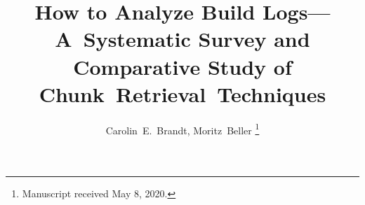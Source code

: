 \documentclass[10pt,journal,compsoc]{IEEEtran}
\begin{document}
%

\title{How to Analyze Build Logs---A~Systematic Survey and Comparative Study of Chunk~Retrieval~Techniques}
%
%
%
%

\author{Carolin~E.~Brandt, %
        Moritz~Beller%
\thanks{Manuscript received May 8, 2020.}}
\end{document}

